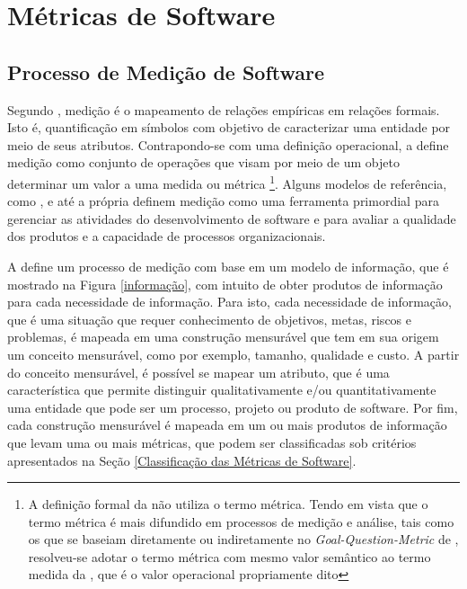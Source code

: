 \chapter{Métricas de Software}
\label{chap:metricas}

\section{Processo de Medição de Software}

Segundo , medição é o mapeamento de relações empíricas em relações formais. Isto é, quantificação em símbolos com objetivo de caracterizar uma entidade por meio de seus atributos. Contrapondo-se com uma definição operacional, a  define medição como conjunto de operações que visam por meio de um objeto determinar um valor a uma medida ou métrica \footnote{A definição formal da  não utiliza o termo métrica. Tendo em vista que o termo métrica é mais difundido em processos de medição e análise, tais como os que se baseiam diretamente ou indiretamente no \textit{Goal-Question-Metric} de , resolveu-se adotar o termo métrica com mesmo valor semântico ao termo medida da , que é o valor operacional propriamente dito}. Alguns modelos de referência, como , e até a própria  definem medição como uma ferramenta primordial para gerenciar as atividades do desenvolvimento de software e para avaliar a qualidade dos produtos e a capacidade de processos organizacionais. 


A  define um processo de medição com base em um modelo de
informação, que é mostrado na Figura \ref{informação}, com intuito de obter produtos de informação para cada necessidade de informação. Para isto, cada necessidade de informação, que é uma situação que requer conhecimento de objetivos, metas, riscos e problemas, é mapeada em uma construção  mensurável que tem em sua origem um conceito mensurável, como por exemplo, tamanho, qualidade e custo. A partir do conceito mensurável, é possível se mapear um atributo, que é uma característica que permite distinguir qualitativamente e/ou quantitativamente uma entidade que pode ser um processo, projeto ou produto de software. Por fim, cada construção mensurável é mapeada em um ou mais produtos de informação que levam uma ou mais métricas, que podem ser classificadas sob  critérios apresentados na Seção \ref{Classificação das Métricas de Software}.


